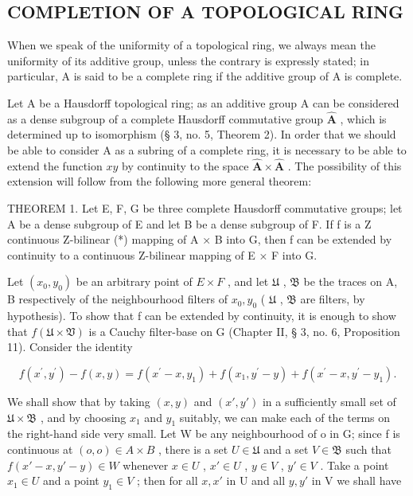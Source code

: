 \subsection{COMPLETION OF A TOPOLOGICAL RING}

When we speak of the uniformity of a topological ring, we always mean the uniformity of its additive group, unless the contrary is expressly stated; in particular, A is said to be a complete ring if the additive group of A is complete.

Let A be a Hausdorff topological ring; as an additive group A can be considered as a dense subgroup of a complete Hausdorff commutative group \(\hat{\mathbf{A}}\) , which is determined up to isomorphism (§ 3, no. 5, Theorem 2). In order that we should be able to consider A as a subring of a complete ring, it is necessary to be able to extend the function \(xy\) by continuity to the space \(\hat{\mathbf{A}} \times \hat{\mathbf{A}}\) . The possibility of this extension will follow from the following more general theorem:

THEOREM 1. Let E, F, G be three complete Hausdorff commutative groups; let A be a dense subgroup of E and let B be a dense subgroup of F. If f is a Z continuous Z-bilinear (*) mapping of A × B into G, then f can be extended by continuity to a continuous Z-bilinear mapping of E × F into G.

Let \((x_{0}, y_{0})\) be an arbitrary point of \(E \times F\) , and let \(\mathfrak{U}\) , \(\mathfrak{B}\) be the traces on A, B respectively of the neighbourhood filters of \(x_{0}, y_{0}\) ( \(\mathfrak{U}\) , \(\mathfrak{B}\) are filters, by hypothesis). To show that f can be extended by continuity, it is enough to show that \(f(\mathfrak{U} \times \mathfrak{V})\) is a Cauchy filter-base on G (Chapter II, § 3, no. 6, Proposition 11). Consider the identity

\[
f \left(x ^ {\prime}, y ^ {\prime}\right) - f (x, y) = f \left(x ^ {\prime} - x, y _ {1}\right) + f \left(x _ {1}, y ^ {\prime} - y\right) + f \left(x ^ {\prime} - x, y ^ {\prime} - y _ {1}\right).
\]

We shall show that by taking \((x, y)\) and \((x', y')\) in a sufficiently small set of \(\mathfrak{U} \times \mathfrak{B}\) , and by choosing \(x_{1}\) and \(y_{1}\) suitably, we can make each of the terms on the right-hand side very small. Let W be any neighbourhood of o in G; since f is continuous at \((o, o) \in A \times B\) , there is a set \(U \in \mathfrak{U}\) and a set \(V \in \mathfrak{B}\) such that \(f(x' - x, y' - y) \in W\) whenever \(x \in U\) , \(x' \in U\) , \(y \in V\) , \(y' \in V\) . Take a point \(x_{1} \in U\) and a point \(y_{1} \in V\) ; then for all \(x, x'\) in U and all \(y, y'\) in V we shall have

